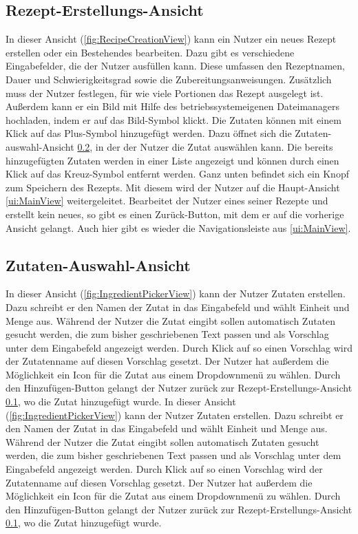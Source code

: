 \documentclass[parskip=full]{scrartcl}
\begin{document}
\subsection{Rezept-Erstellungs-Ansicht}
\label{ui:RecipeCreationView}
In dieser Ansicht (\autoref{fig:RecipeCreationView}) kann ein Nutzer ein neues Rezept erstellen oder ein Bestehendes bearbeiten. Dazu gibt es verschiedene Eingabefelder, die der Nutzer ausfüllen kann. Diese umfassen den Rezeptnamen, Dauer und Schwierigkeitsgrad sowie die Zubereitungsanweisungen. Zusätzlich muss der Nutzer festlegen, für wie viele Portionen das Rezept ausgelegt ist. Außerdem kann er ein Bild mit Hilfe des betriebssystemeigenen Dateimanagers hochladen, indem er auf das Bild-Symbol klickt.
Die Zutaten können mit einem Klick auf das Plus-Symbol hinzugefügt werden. Dazu öffnet sich die Zutaten-auswahl-Ansicht \ref{ui:IngredientPickerView}, in der der Nutzer die Zutat auswählen kann. Die bereits hinzugefügten Zutaten werden in einer Liste angezeigt und können durch einen Klick auf das Kreuz-Symbol entfernt werden. Ganz unten befindet sich ein Knopf zum Speichern des Rezepts. Mit diesem wird der Nutzer auf die Haupt-Ansicht \ref{ui:MainView} weitergeleitet. Bearbeitet der Nutzer eines seiner Rezepte und erstellt kein neues, so gibt es einen Zurück-Button, mit dem er auf die vorherige Ansicht gelangt. Auch hier gibt es wieder die Navigationsleiste aus \ref{ui:MainView}.

\subsection{Zutaten-Auswahl-Ansicht}
\label{ui:IngredientPickerView}
In dieser Ansicht (\autoref{fig:IngredientPickerView}) kann der Nutzer Zutaten erstellen. Dazu schreibt er den Namen der Zutat in das Eingabefeld und wählt Einheit und Menge aus. Während der Nutzer die Zutat eingibt sollen automatisch Zutaten gesucht werden, die zum bisher geschriebenen Text passen und als Vorschlag unter dem Eingabefeld angezeigt werden. Durch Klick auf so einen Vorschlag wird der Zutatenname auf diesen Vorschlag gesetzt. Der Nutzer hat außerdem die Möglichkeit ein Icon für die Zutat aus einem Dropdownmenü zu wählen. Durch den Hinzufügen-Button gelangt der Nutzer zurück zur Rezept-Erstellungs-Ansicht \ref{ui:RecipeCreationView}, wo die Zutat hinzugefügt wurde.
In dieser Ansicht (\autoref{fig:IngredientPickerView}) kann der Nutzer Zutaten erstellen. Dazu schreibt er den Namen der Zutat in das Eingabefeld und wählt Einheit und Menge aus. Während der Nutzer die Zutat eingibt sollen automatisch Zutaten gesucht werden, die zum bisher geschriebenen Text passen und als Vorschlag unter dem Eingabefeld angezeigt werden. Durch Klick auf so einen Vorschlag wird der Zutatenname auf diesen Vorschlag gesetzt. Der Nutzer hat außerdem die Möglichkeit ein Icon für die Zutat aus einem Dropdownmenü zu wählen. Durch den Hinzufügen-Button gelangt der Nutzer zurück zur Rezept-Erstellungs-Ansicht \ref{ui:RecipeCreationView}, wo die Zutat hinzugefügt wurde.
\end{document}
